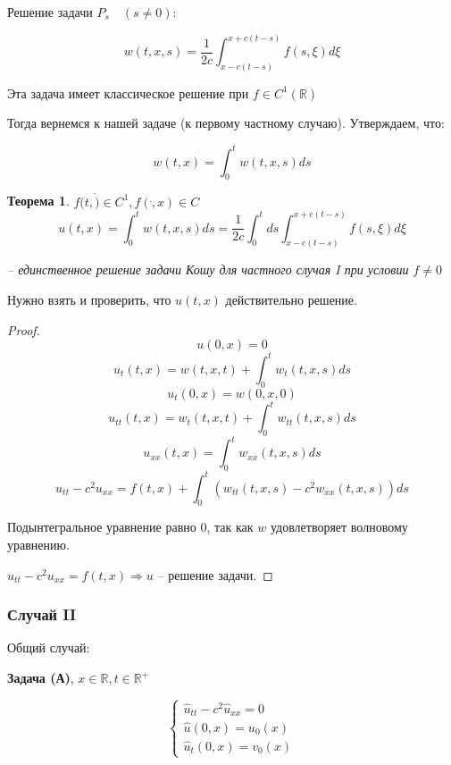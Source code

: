 \documentclass[12pt]{report}
\newtheorem{theorem}{Теорема}
\begin{document}
Решение задачи $P_s \quad (s \neq 0)$:

\[
    w(t, x, s) = \frac{1}{2c} \int^{x + c(t - s)}_{x - c(t - s)}{f(s, \xi) d\xi}
\]

Эта задача имеет классическое решение при $f \in C ^ 1 (\mathbb{R})$

Тогда вернемся к нашей задаче (к первому частному случаю). Утверждаем, что:

$$w(t, x) = \int^{t}_{0}{w(t, x, s) ds}$$

\begin{theorem}
    $f(t, \dot) \in C ^ 1, f(\dot, x) \in C$
    $$
        u(t, x) = \int^{t}_{0}{w(t, x, s)ds} = \frac{1}{2c} \int^{t}_{0}{ds \int^{x + c(t - s)}_{x - c(t - s)}{f(s, \xi)d\xi}}
    $$
    
    -- единственное решение задачи Кошу для частного случая I при условии $f \ne 0$
\end{theorem}

Нужно взять и проверить, что $u(t, x)$ действительно решение.

\begin{proof}
    $$u(0, x) = 0$$
    $$u_t(t, x) = w(t, x, t) + \int^{t}_{0}{w_t(t, x, s)ds}$$
    $$u_t(0, x) = w(0, x, 0)$$
    $$u_{tt}(t, x) = w_t(t, x, t) + \int^{t}_{0}{w_{tt}(t, x, s)ds}$$
    $$u_{xx}(t, x) = \int^{t}_{0}{w_{xx}(t, x, s)ds}$$
    $$u_{tt} - c ^ 2 u_{xx} = f(t, x) + \int^{t}_{0}{(w_{tt}(t, x, s) - c ^ 2 w_{xx}(t, x, s))ds}$$
    
    Подынтегральное уравнение равно $0$, так как $w$ удовлетворяет волновому уравнению.
    
    $u_{tt} - c ^ 2 u_{xx} = f(t, x) \Longrightarrow u$ -- решение задачи.
\end{proof}

\subsubsection{Случай II}
Общий случай: 

\textbf{Задача (А)}, $x \in \mathbb{R}, t \in \mathbb{R} ^ +$

\begin{equation} \label{pro:A}
    \begin{cases}
        \hat{u}_{tt} - c ^ 2 \hat{u}_{xx} = 0
        \\
        \hat{u}(0, x) = u_0(x)
        \\
        \hat{u}_t(0, x) = v_0(x)
    \end{cases}
\end{equation}
\end{document}

